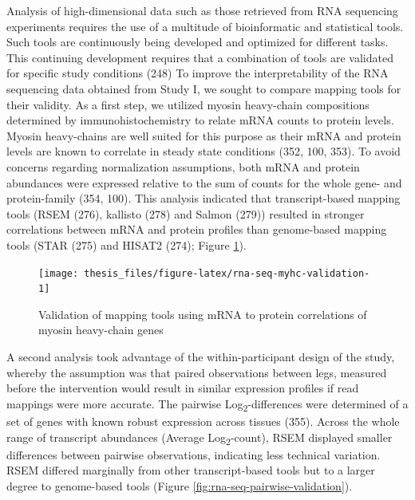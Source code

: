 \documentclass[twoside,10pt]{gihclass} %
\begin{document}
Analysis of high-dimensional data such as those retrieved from RNA sequencing experiments requires the use of a multitude of bioinformatic and statistical tools. Such tools are continuously being developed and optimized for different tasks. This continuing development requires that a combination of tools are validated for specific study conditions (248)
To improve the interpretability of the RNA sequencing data obtained from Study I, we sought to compare mapping tools for their validity. As a first step, we utilized myosin heavy-chain compositions determined by immunohistochemistry to relate mRNA counts to protein levels. Myosin heavy-chains are well suited for this purpose as their mRNA and protein levels are known to correlate in steady state conditions
(352, 100, 353).
To avoid concerns regarding normalization assumptions, both mRNA and protein abundances were expressed relative to the sum of counts for the whole gene- and protein-family
(354, 100).
This analysis indicated that transcript-based mapping tools
(RSEM (276),
kallisto (278) and Salmon (279))
resulted in stronger correlations between mRNA and protein profiles than genome-based mapping tools
(STAR (275)
and HISAT2 (274); Figure \ref{fig:rna-seq-myhc-validation}).
\begin{figure}

{\centering \texttt{[image: thesis\_files/figure-latex/rna-seq-myhc-validation-1]} 

}

\caption[Correlations between gene-family normalized protein and gene data from different mRNA quantification methods.]{Validation of mapping tools using mRNA to protein correlations of myosin heavy-chain genes}\label{fig:rna-seq-myhc-validation}
\end{figure}
A second analysis took advantage of the within-participant design of the study, whereby the assumption was that paired observations between legs, measured before the intervention would result in similar expression profiles if read mappings were more accurate. The pairwise Log\textsubscript{2}-differences were determined of a set of genes with known robust expression across tissues (355).
Across the whole range of transcript abundances (Average Log\textsubscript{2}-count), RSEM displayed smaller differences between pairwise observations, indicating less technical variation. RSEM differed marginally from other transcript-based tools but to a larger degree to genome-based tools (Figure \ref{fig:rna-seq-pairwise-validation}).
\end{document}
